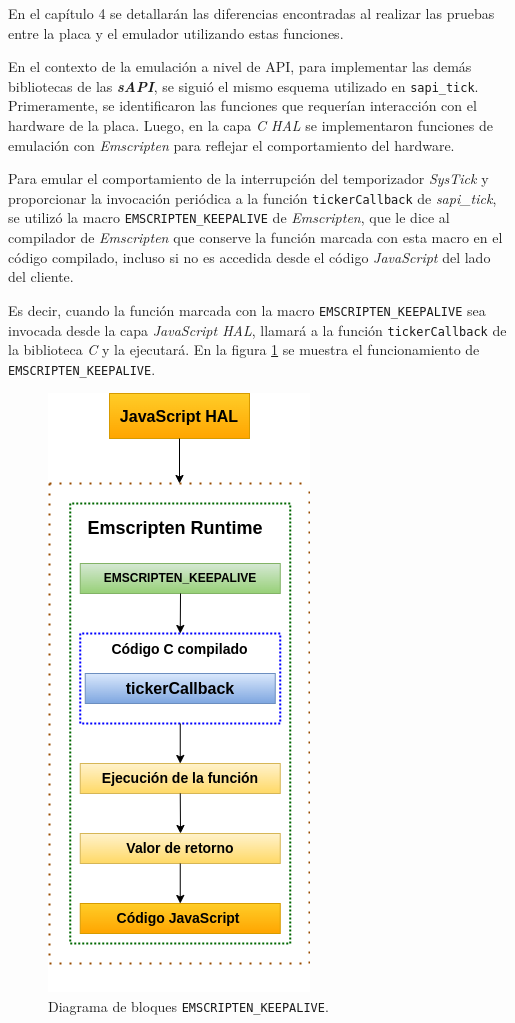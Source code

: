 En el capítulo 4 se detallarán las diferencias encontradas al realizar las pruebas entre la placa y el emulador utilizando estas funciones.

En el contexto de la emulación a nivel de API, para implementar las demás bibliotecas de las \textit{\textbf{sAPI}}, se siguió el mismo esquema utilizado en \texttt{sapi\_tick}. Primeramente, se identificaron las funciones que requerían interacción con el hardware de la placa. Luego, en la capa \textit{C HAL} se implementaron funciones de emulación con \textit{Emscripten} para reflejar el comportamiento del hardware.

Para emular el comportamiento de la interrupción del temporizador \textit{SysTick} y proporcionar la invocación periódica a la función \texttt{tickerCallback} de \textit{sapi\_tick}, se utilizó la macro \texttt{EMSCRIPTEN\_KEEPALIVE} de \textit{Emscripten}, que le dice al compilador de \textit{Emscripten} que conserve la función marcada con esta macro en el código compilado, incluso si no es accedida desde el código \textit{JavaScript} del lado del cliente.

Es decir, cuando la función marcada con la macro \texttt{EMSCRIPTEN\_KEEPALIVE} sea invocada desde la capa \textit{JavaScript HAL}, llamará a la función \texttt{tickerCallback} de la biblioteca \textit{C} y la ejecutará. En la figura \ref{fig:tickerCallback} se muestra el funcionamiento de \texttt{EMSCRIPTEN\_KEEPALIVE}. 


\begin{figure}[ht]
	\centering
	\includegraphics[scale=.55]{./Figures/tickerCallback.png}
	\caption{Diagrama de bloques \texttt{EMSCRIPTEN\_KEEPALIVE}.}
	\label{fig:tickerCallback}
\end{figure}



